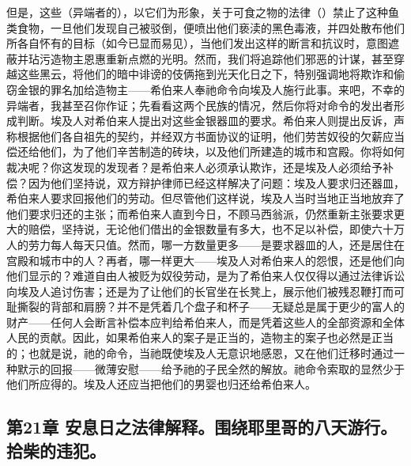 但是，这些（异端者的），以它们为形象，关于可食之物的法律（）禁止了这种鱼类食物，一旦他们发现自己被驳倒，便喷出他们亵渎的黑色毒液，并四处散布他们所各自怀有的目标（如今已显而易见），当他们发出这样的断言和抗议时，意图遮蔽并玷污造物主恩惠重新点燃的光明。然而，我们将追踪他们邪恶的计谋，甚至穿越这些黑云，将他们的暗中诽谤的伎俩拖到光天化日之下，特别强调地将欺诈和偷窃金银的罪名加给造物主——希伯来人奉祂命令向埃及人施行此事。来吧，不幸的异端者，我甚至召你作证；先看看这两个民族的情况，然后你将对命令的发出者形成判断。埃及人对希伯来人提出对这些金银器皿的要求。希伯来人则提出反诉，声称根据他们各自祖先的契约，并经双方书面协议的证明，他们劳苦奴役的欠薪应当偿还给他们，为了他们辛苦制造的砖块，以及他们所建造的城市和宫殿。你将如何裁决呢？你这发现的发现者？是希伯来人必须承认欺诈，还是埃及人必须给予补偿？因为他们坚持说，双方辩护律师已经这样解决了问题：埃及人要求归还器皿，希伯来人要求回报他们的劳动。但尽管他们这样说，埃及人当时当地正当地放弃了他们要求归还的主张；而希伯来人直到今日，不顾马西翁派，仍然重新主张要求更大的赔偿，坚持说，无论他们借出的金银数量有多大，也不足以补偿，即使六十万人的劳力每人每天只值。然而，哪一方数量更多——是要求器皿的人，还是居住在宫殿和城市中的人？再者，哪一样更大——埃及人对希伯来人的怨恨，还是他们向他们显示的？难道自由人被贬为奴役劳动，是为了希伯来人仅仅得以通过法律诉讼向埃及人追讨伤害；还是为了让他们的长官坐在长凳上，展示他们被残忍鞭打而可耻撕裂的背部和肩膀？并不是凭着几个盘子和杯子——无疑总是属于更少的富人的财产——任何人会断言补偿本应判给希伯来人，而是凭着这些人的全部资源和全体人民的贡献。因此，如果希伯来人的案子是正当的，造物主的案子也必然是正当的；也就是说，祂的命令，当祂既使埃及人无意识地感恩，又在他们迁移时通过一种默示的回报——微薄安慰——给予祂的子民全然的解放。祂命令索取的显然少于他们所应得的。埃及人还应当把他们的男婴也归还给希伯来人。\par


\subsection{第21章 安息日之法律解释。围绕耶里哥的八天游行。拾柴的违犯。}

